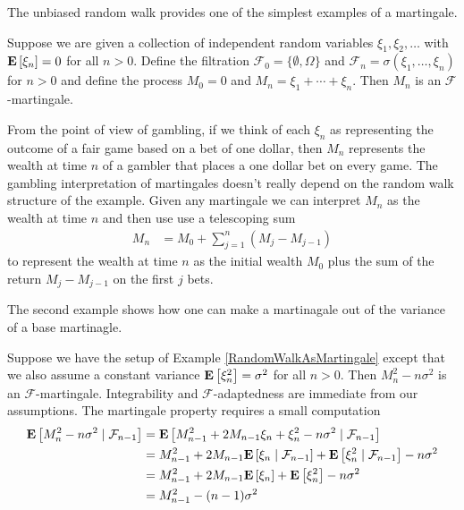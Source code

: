 The unbiased random walk provides one of the simplest examples of a martingale.
\begin{examp}\label{RandomWalkAsMartingale}Suppose we are given a collection of independent random
  variables $\xi_1, \xi_2, \dots$ with $\expectation{\xi_n} = 0$ for
  all $n > 0$.  Define the filtration
  $\mathcal{F}_0 = \lbrace \emptyset, \Omega \rbrace$ and
  $\mathcal{F}_n = \sigma(\xi_1, \dots, \xi_n)$ for $n > 0$ and define
  the process $M_0=0$ and $M_n = \xi_1 + \cdots + \xi_n$.  Then $M_n$
  is an $\mathcal{F}$-martingale.
\end{examp}
From the point of view of gambling, if we think of each $\xi_n$ as
representing the outcome of a fair game based on a bet of one dollar,
then $M_n$ represents the wealth at time $n$ of a gambler that places a one dollar
bet on every game.  The gambling interpretation of martingales doesn't
really depend on the random walk structure of the example.  Given any
martingale we can interpret $M_n$ as the wealth at time $n$ and then
use use a telescoping sum
\begin{align*}
M_n &= M_0 + \sum_{j=1}^n (M_j - M_{j-1})
\end{align*}
to represent the wealth at time $n$ as the initial wealth $M_0$ plus
the sum of the return $M_j - M_{j-1}$ on the first $j$ bets.

The second example shows how one can make a martinagale out of the
variance of a base martinagle.
\begin{examp}Suppose we have the setup of Example
  \ref{RandomWalkAsMartingale} except that we also assume a constant variance
  $\expectation{\xi_n^2} = \sigma^2$ for all $n > 0$.  Then $M_n^2 - n
  \sigma^2$ is an $\mathcal{F}$-martingale.  Integrability and
  $\mathcal{F}$-adaptedness are immediate from our assumptions.  The
  martingale property requires a small computation
\begin{align*}
\cexpectationlong{\mathcal{F}_{n-1}}{M_n^2 - n \sigma^2} &=
\cexpectationlong{\mathcal{F}_{n-1}}{M_{n-1}^2 + 2 M_{n-1} \xi_n +
  \xi_n^2 - n \sigma^2} \\
&=M_{n-1}^2 +  2 M_{n-1} \cexpectationlong{\mathcal{F}_{n-1}}{\xi_n}
+  \cexpectationlong{\mathcal{F}_{n-1}}{ \xi_n^2} - n \sigma^2 \\
&=M_{n-1}^2 +  2 M_{n-1} \expectation{\xi_n}
+  \expectation{ \xi_n^2} - n \sigma^2 \\
&= M_{n-1}^2 - (n-1)\sigma^2
\end{align*}
\end{examp}


